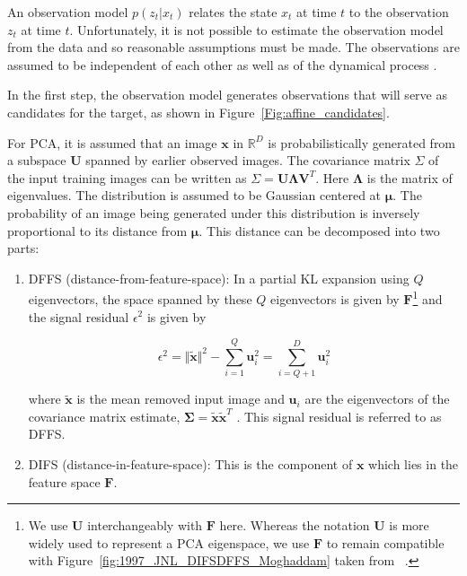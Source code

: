 An observation model $p(z_t|x_t)$ relates the state $x_t$ at time $t$ to the observation $z_t$ at time $t$.  Unfortunately, it is not possible to estimate the observation model from the data and so reasonable assumptions must be made.  The observations are assumed to be independent of each other as well as of the dynamical process \cite{1998_JNL_Condensation_IsardBlake}. 


In the first step, the observation model generates observations that will serve as candidates for the target, as shown in Figure~\ref{Fig:affine_candidates}.  

For PCA, it is assumed that an image $\mathbf{x}$ in $\mathbb{R}^D$ is probabilistically generated from a subspace $\mathbf{U}$ spanned by earlier observed images.  The covariance matrix $\Sigma$ of the input training images can be written as $\Sigma = \mathbf{U}\mathbf{\Lambda} \mathbf{V}^T$.  Here $\mathbf{\Lambda}$ is the matrix of eigenvalues.  The distribution is assumed to be Gaussian centered at $\boldsymbol{\mu}$.  The probability of an image being generated under this distribution is inversely proportional to its distance from $\boldsymbol{\mu}$.  This distance can be decomposed into two parts:

\begin{enumerate}
\item DFFS (distance-from-feature-space):  In a partial KL expansion using $Q$ eigenvectors, the space spanned by these $Q$ eigenvectors is given by $\mathbf{F}$\footnote{We use $\mathbf{U}$ interchangeably with $\mathbf{F}$ here.  Whereas the notation $\mathbf{U}$ is more widely used to represent a PCA eigenspace, we use $\mathbf{F}$ to remain compatible with Figure~\ref{fig:1997_JNL_DIFSDFFS_Moghaddam} taken from ~\cite{1997_JNL_EigenTRK_Moghaddam}.} and the signal residual $\epsilon^2$ is given by

\begin{equation}
\epsilon^2 = \Vert \tilde{\mathbf{x}} \Vert^2 - \sum\limits_{i=1}^Q \mathbf{u}_i^2 = \sum\limits_{i=Q+1}^D \mathbf{u}_i^2
\end{equation}

where $\tilde{\mathbf{x}}$ is the mean removed input image and $\mathbf{u}_i$ are the eigenvectors of the covariance matrix estimate, $\boldsymbol\Sigma=\tilde{\mathbf{x}}\tilde{\mathbf{x}}^T$  .  This signal residual is referred to as DFFS.
\item DIFS (distance-in-feature-space):  This is the component of $\mathbf{x}$ which lies in the feature space $\mathbf{F}$.  
\end{enumerate}


